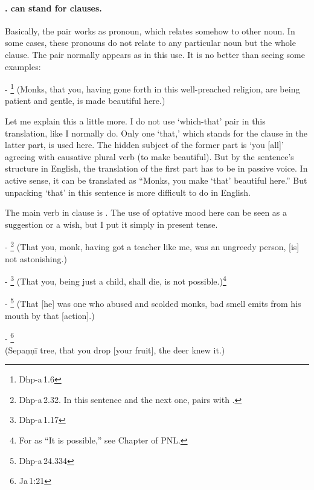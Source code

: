 \paragraph*{.  can stand for clauses.} Basically, the  pair works as pronoun, which relates somehow to other noun. In some cases, these pronouns do not relate to any particular noun but the whole clause. The pair normally appears as  in this use. It is no better than seeing some examples:\par
- \footnote{Dhp-a\,1.6} (Monks, that you, having gone forth in this well-preached religion, are being patient and gentle, is made beautiful here.)\par
Let me explain this a little more. I do not use `which-that' pair in this translation, like I normally do. Only one `that,' which stands for the  clause in the latter part, is used here. The hidden subject of the former part is `you [all]' agreeing with causative plural verb  (to make beautiful). But by the sentence's structure in English, the translation of the first part has to be in passive voice. In active sense, it can be translated as ``Monks, you make `that' beautiful here.'' But unpacking `that' in this sentence is more difficult to do in English.\par
The main verb in  clause is . The use of optative mood here can be seen as a suggestion or a wish, but I put it simply in present tense.\par
- \footnote{Dhp-a\,2.32. In this sentence and the next one,  pairs with .} (That you, monk, having got a teacher like me, was an ungreedy person, [is] not astonishing.)\par
- \footnote{Dhp-a\,1.17} (That you, being just a child, shall die, is not possible.)\footnote{For  as ``It is possible,'' see Chapter  of PNL.}\par
- \footnote{Dhp-a\,24.334} (That [he] was one who abused and scolded monks, bad smell emits from his mouth by that [action].)\par
- \footnote{Ja\,1:21} \\(Sepa\d n\d n\=i tree, that you drop [your fruit], the deer knew it.)\par

